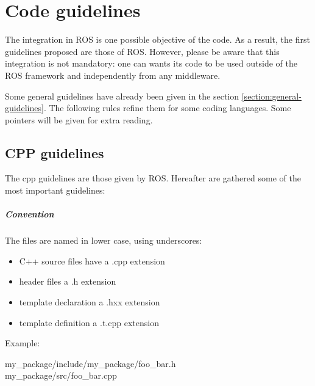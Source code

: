 \chapter{Code guidelines}


The integration in ROS is one possible objective of the code.
As a result,  the first guidelines proposed are those of ROS.
However, please be aware that this integration is not mandatory: one can wants its code to be used outside of the ROS framework and independently from any middleware.


Some general guidelines have already been given in the section \ref{section:general-guidelines}. 
The following rules refine them for some coding languages.
Some pointers will be given for extra reading.


\section{CPP guidelines}

The cpp guidelines are those given by ROS.
Hereafter are gathered some of the most important guidelines:

\paragraph{Convention}
The files are named in lower case, using underscores:\\

\begin{itemize}
\item C++ source files have a .cpp extension
\item header files a .h extension
\item template declaration a .hxx extension 
\item template definition a .t.cpp extension
\end{itemize}
Example:\\
\begin{tt}
my\_package/include/my\_package/foo\_bar.h\\
my\_package/src/foo\_bar.cpp\\
\end{tt}


